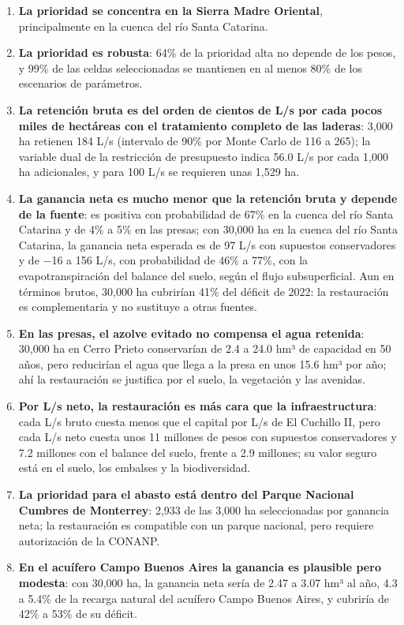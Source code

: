 \documentclass[11pt,letterpaper]{article}
\begin{document}
\begin{enumerate}
  \item \textbf{La prioridad se concentra en la Sierra Madre Oriental}, principalmente en la cuenca del río Santa Catarina.
  \item \textbf{La prioridad es robusta}: 64\% de la prioridad alta no depende de los pesos, y 99\% de las celdas seleccionadas se mantienen en al menos 80\% de los escenarios de parámetros.
  \item \textbf{La retención bruta es del orden de cientos de L/s por cada pocos miles de hectáreas con el tratamiento completo de las laderas}: 3,000 ha retienen 184 L/s (intervalo de 90\% por Monte Carlo de 116 a 265); la variable dual de la restricción de presupuesto indica 56.0 L/s por cada 1,000 ha adicionales, y para 100 L/s se requieren unas 1,529 ha.
  \item \textbf{La ganancia neta es mucho menor que la retención bruta y depende de la fuente}: es positiva con probabilidad de 67\% en la cuenca del río Santa Catarina y de 4\% a 5\% en las presas; con 30,000 ha en la cuenca del río Santa Catarina, la ganancia neta esperada es de 97 L/s con supuestos conservadores y de −16 a 156 L/s, con probabilidad de 46\% a 77\%, con la evapotranspiración del balance del suelo, según el flujo subsuperficial. Aun en términos brutos, 30,000 ha cubrirían 41\% del déficit de 2022: la restauración es complementaria y no sustituye a otras fuentes.
  \item \textbf{En las presas, el azolve evitado no compensa el agua retenida}: 30,000 ha en Cerro Prieto conservarían de 2.4 a 24.0 hm³ de capacidad en 50 años, pero reducirían el agua que llega a la presa en unos 15.6 hm³ por año; ahí la restauración se justifica por el suelo, la vegetación y las avenidas.
  \item \textbf{Por L/s neto, la restauración es más cara que la infraestructura}: cada L/s bruto cuesta menos que el capital por L/s de El Cuchillo II, pero cada L/s neto cuesta unos 11 millones de pesos con supuestos conservadores y 7.2 millones con el balance del suelo, frente a 2.9 millones; su valor seguro está en el suelo, los embalses y la biodiversidad.
  \item \textbf{La prioridad para el abasto está dentro del Parque Nacional Cumbres de Monterrey}: 2,933 de las 3,000 ha seleccionadas por ganancia neta; la restauración es compatible con un parque nacional, pero requiere autorización de la CONANP.
  \item \textbf{En el acuífero Campo Buenos Aires la ganancia es plausible pero modesta}: con 30,000 ha, la ganancia neta sería de 2.47 a 3.07 hm³ al año, 4.3 a 5.4\% de la recarga natural del acuífero Campo Buenos Aires, y cubriría de 42\% a 53\% de su déficit.

\end{enumerate}
\end{document}
